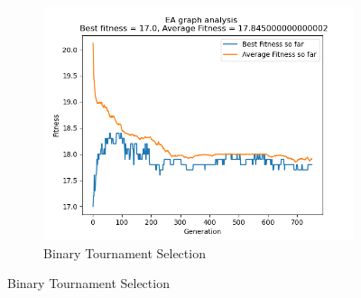 \documentclass[conference,compsoc]{IEEEtran}
\begin{document}
\begin{figure}[h!]
\begin{subfigure}{0.34\textwidth}
    \includegraphics[width=\linewidth]{../Results/_23_BT_Truncation_100_50_750.png}
    \caption{Binary Tournament Selection}
  \end{subfigure}
\end{figure}
\end{document}
